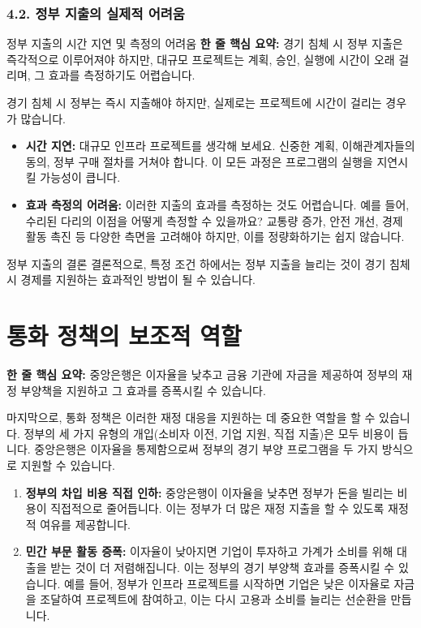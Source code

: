 \documentclass[11pt,a4paper]{article}
\theoremstyle{definition}
\begin{document}
\subsubsection*{4.2. 정부 지출의 실제적 어려움}

\begin{cautionbox}{정부 지출의 시간 지연 및 측정의 어려움}
    \textbf{한 줄 핵심 요약:} 경기 침체 시 정부 지출은 즉각적으로 이루어져야 하지만, 대규모 프로젝트는 계획, 승인, 실행에 시간이 오래 걸리며, 그 효과를 측정하기도 어렵습니다.
\end{cautionbox}

경기 침체 시 정부는 즉시 지출해야 하지만, 실제로는 프로젝트에 시간이 걸리는 경우가 많습니다.
\begin{itemize}
    \item \textbf{시간 지연:} 대규모 인프라 프로젝트를 생각해 보세요. 신중한 계획, 이해관계자들의 동의, 정부 구매 절차를 거쳐야 합니다. 이 모든 과정은 프로그램의 실행을 지연시킬 가능성이 큽니다.
    \item \textbf{효과 측정의 어려움:} 이러한 지출의 효과를 측정하는 것도 어렵습니다. 예를 들어, 수리된 다리의 이점을 어떻게 측정할 수 있을까요? 교통량 증가, 안전 개선, 경제 활동 촉진 등 다양한 측면을 고려해야 하지만, 이를 정량화하기는 쉽지 않습니다.
\end{itemize}

\begin{summarybox}{정부 지출의 결론}
    결론적으로, 특정 조건 하에서는 정부 지출을 늘리는 것이 경기 침체 시 경제를 지원하는 효과적인 방법이 될 수 있습니다.
\end{summarybox}

\newpage
\section{통화 정책의 보조적 역할}

\begin{tcolorbox}[mybox={재정 정책을 지원하는 통화 정책}]
    \textbf{한 줄 핵심 요약:} 중앙은행은 이자율을 낮추고 금융 기관에 자금을 제공하여 정부의 재정 부양책을 지원하고 그 효과를 증폭시킬 수 있습니다.
\end{tcolorbox}

마지막으로, 통화 정책은 이러한 재정 대응을 지원하는 데 중요한 역할을 할 수 있습니다. 정부의 세 가지 유형의 개입(소비자 이전, 기업 지원, 직접 지출)은 모두 비용이 듭니다. 중앙은행은 이자율을 통제함으로써 정부의 경기 부양 프로그램을 두 가지 방식으로 지원할 수 있습니다.

\begin{enumerate}
    \item \textbf{정부의 차입 비용 직접 인하:} 중앙은행이 이자율을 낮추면 정부가 돈을 빌리는 비용이 직접적으로 줄어듭니다. 이는 정부가 더 많은 재정 지출을 할 수 있도록 재정적 여유를 제공합니다.
    \item \textbf{민간 부문 활동 증폭:} 이자율이 낮아지면 기업이 투자하고 가계가 소비를 위해 대출을 받는 것이 더 저렴해집니다. 이는 정부의 경기 부양책 효과를 증폭시킬 수 있습니다. 예를 들어, 정부가 인프라 프로젝트를 시작하면 기업은 낮은 이자율로 자금을 조달하여 프로젝트에 참여하고, 이는 다시 고용과 소비를 늘리는 선순환을 만듭니다.
\end{enumerate}
\end{document}
